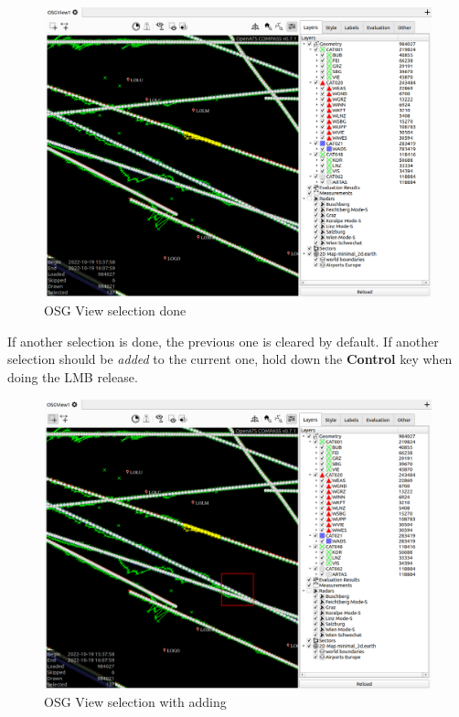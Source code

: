 \begin{figure}[H]
    \hspace*{-2.5cm}
    \includegraphics[width=19cm,frame]{figures/osgview_select2.png}
  \caption{OSG View selection done}
\end{figure}

If another selection is done, the previous one is cleared by default. If another selection should be \textit{added} to the current one, hold down the \textbf{Control} key when doing the LMB release.

\begin{figure}[H]
    \hspace*{-2.5cm}
    \includegraphics[width=19cm,frame]{figures/osgview_select_add1.png}
  \caption{OSG View selection with adding}
\end{figure}


